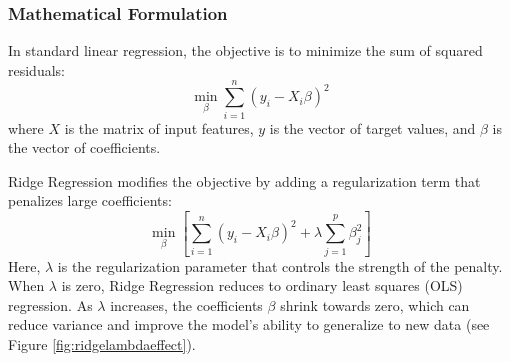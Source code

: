 \documentclass[english,11pt,a4paper,titlepage]{article}
\begin{document}
	\subsubsection*{Mathematical Formulation}
	In standard linear regression, the objective is to minimize the sum of squared residuals:
	\begin{equation} 
		\min_\beta \sum_{i=1}^{n}(y_i - X_i\beta)^2
	\end{equation}
	where $X$ is the matrix of input features, $y$ is the vector of target values, and $\beta$ is the vector of coefficients.
	
	Ridge Regression modifies the objective by adding a regularization term that penalizes large coefficients:
	\begin{equation}
		\min_\beta \left[\sum_{i=1}^{n}(y_i - X_i\beta)^2 + \lambda \sum_{j=1}^{p}\beta_{j}^{2}\right]
	\end{equation}
	Here, $\lambda$ is the regularization parameter that controls the strength of the penalty. When $\lambda$ is zero, Ridge Regression reduces to ordinary least squares (OLS) regression. As $\lambda$ increases, the coefficients $\beta$ shrink towards zero, which can reduce variance and improve the model's ability to generalize to new data \cite{hoerlRidgeRegressionBiased1970,hastieElementsStatisticalLearning2009} (see Figure \ref{fig:ridgelambdaeffect}).
	
\end{document}
